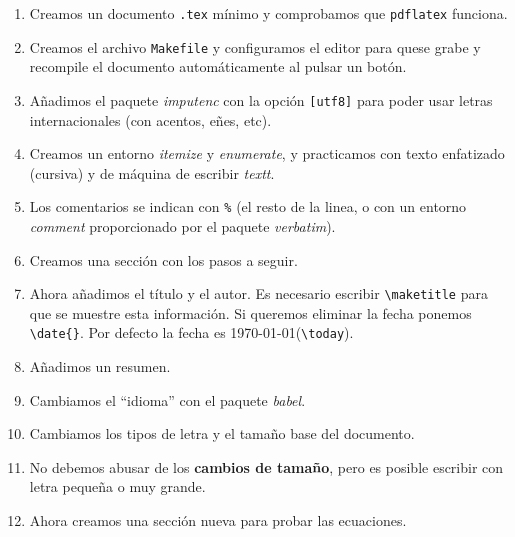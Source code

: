 \documentclass[a4,12pt]{article}
\begin{document}
\begin{enumerate}

\item Creamos un documento \texttt{.tex} mínimo y comprobamos que \texttt{pdflatex} funciona.

\item Creamos el archivo \texttt{Makefile} y configuramos el editor para quese grabe y recompile el documento automáticamente al pulsar un botón.

\item Añadimos el paquete \emph{imputenc} con la opción \texttt{[utf8]} para poder usar letras internacionales (con acentos, eñes, etc).

\item Creamos un entorno \emph{itemize} y \emph{enumerate}, y practicamos con texto enfatizado (cursiva) y de máquina de escribir \emph{textt}.

\item Los comentarios se indican con \verb+%+ (el resto de la linea, o con un entorno \emph{comment} proporcionado por el paquete \emph{verbatim}).

\item Creamos una sección con los pasos a seguir.

\item Ahora añadimos el título y el autor. Es necesario escribir \verb+\maketitle+ para que se muestre esta información. Si queremos eliminar la fecha ponemos \verb+\date{}+. Por defecto la fecha es \today (\verb+\today+).

\item Añadimos un resumen.

\item Cambiamos el ``idioma'' con el paquete \emph{babel}.

\item Cambiamos los tipos de letra y el tamaño base del documento.

\item No debemos abusar de los \textbf{cambios de tamaño}, pero es posible escribir {\scriptsize con letra pequeña} o {\huge muy grande}.

\item Ahora creamos una sección nueva para probar las ecuaciones.


\end{enumerate}
\end{document}
